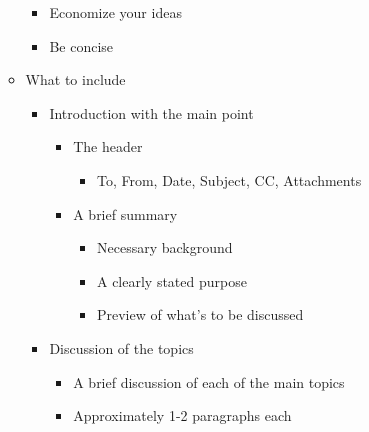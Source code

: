 \begin{itemize}
\begin{itemize}
        \begin{itemize}

          \item Economize your ideas

          \item Be concise

        \end{itemize}

      \item What to include

        \begin{itemize}

          \item Introduction with the main point

            \begin{itemize}

              \item The header

                \begin{itemize}

                  \item To, From, Date, Subject, CC, Attachments

                \end{itemize}

              \item A brief summary

                \begin{itemize}

                  \item Necessary background

                  \item A clearly stated purpose

                  \item Preview of what's to be discussed

                \end{itemize}

            \end{itemize}

          \item Discussion of the topics

            \begin{itemize}

              \item A brief discussion of each of the main topics

              \item Approximately 1-2 paragraphs each


\end{itemize}
\end{itemize}
\end{itemize}
\end{itemize}
